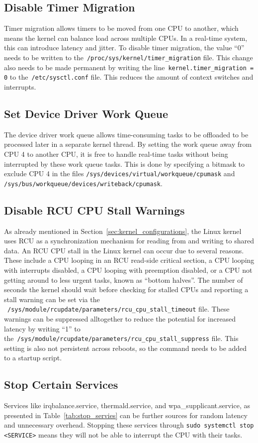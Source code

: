 \documentclass[MMR,Master,english]{twbook}
\begin{document}
\subsection{Disable Timer Migration}
Timer migration allows timers to be moved from one CPU to another, which means the kernel can balance load across multiple CPUs. In a real-time system, this can introduce latency and jitter. To disable timer migration, the value ``0'' needs to be written to the~\texttt{/proc/sys/kernel/timer\_migration} file. This change also needs to be made permanent by writing the line~\texttt{kernel.timer\_migration = 0} to the~\texttt{/etc/sysctl.conf} file. This reduces the amount of context switches and interrupts.
\subsection{Set Device Driver Work Queue}
The device driver work queue allows time-consuming tasks to be offloaded to be processed later in a separate kernel thread. By setting the work queue away from CPU 4 to another CPU, it is free to handle real-time tasks without being interrupted by these work queue tasks. This is done by specifying a bitmask to exclude CPU 4 in the files \texttt{/sys/devices/virtual/workqueue/cpumask} and \texttt{/sys/bus/workqueue/devices/writeback/cpumask}.
\subsection{Disable RCU CPU Stall Warnings}
As already mentioned in Section~\ref{sec:kernel_configurations}, the Linux kernel uses RCU as a synchronization mechanism for reading from and writing to shared data. An RCU CPU stall in the Linux kernel can occur due to several reasons. These include a CPU looping in an RCU read-side critical section, a CPU looping with interrupts disabled, a CPU looping with preemption disabled, or a CPU not getting around to less urgent tasks, known as “bottom halves”. The number of seconds the kernel should wait before checking for stalled CPUs and reporting a stall warning can be set via the ~\texttt{/sys/module/rcupdate/parameters/rcu\_cpu\_stall\_timeout} file. These warnings can be suppressed alltogether to reduce the potential for increased latency by writing ``1'' to the~\texttt{/sys/module/rcupdate/parameters/rcu\_cpu\_stall\_suppress} file. This setting is also not persistent across reboots, so the command needs to be added to a startup script.
\subsection{Stop Certain Services}
Services like irqbalance.service, thermald.service, and wpa\_supplicant.service, as presented in Table~\ref{tab:stop_servies} can be further sources for random latency and unnecessary overhead. Stopping these services through \texttt{sudo systemctl stop <SERVICE>} means they will not be able to interrupt the CPU with their tasks.
\end{document}

